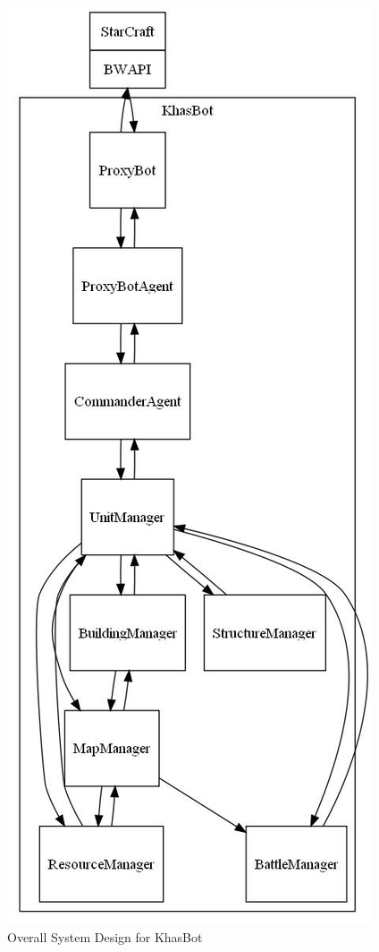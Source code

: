 \documentclass[letterpaper]{article}
\begin{document}
\begin{figure}[hbp]
\begin{center}
\includegraphics[scale=0.5]{TotalSystem.jpg}
\caption{Overall System Design for KhasBot}
\label{fig:System}
\end{center}
\end{figure}
\end{document}
